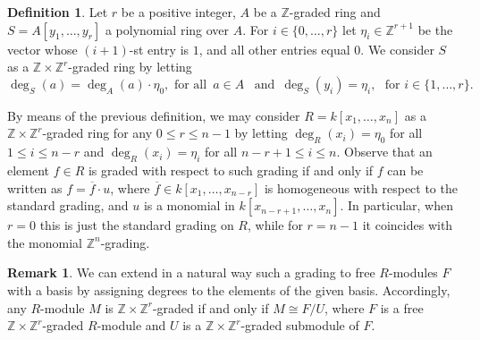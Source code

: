 \documentclass[12pt]{amsart}
\theoremstyle{definition}
\theoremstyle{definition}
\newtheorem{remark}[theorem]{Remark}
\newtheorem{definition}[theorem]{Definition}
\def\NZQ{\mathbb}               %
\def\ZZ{{\NZQ Z}}
\renewcommand{\leq}{\leqslant}
\begin{document}
\begin{definition}
 Let $r$ be a positive integer, $A$ be a $\ZZ$-graded ring and  $S=A[y_1,\ldots,y_r]$ a polynomial ring over $A$. For $i \in \{0,\ldots,r\}$  let $\eta_i \in \ZZ^{r+1}$ be the vector whose $(i+1)$-st entry is $1$, and all other entries equal $0$. We consider $S$ as a $\ZZ \times \ZZ^r$-graded ring by letting
    \[
    \deg_S(a) = \deg_A(a) \cdot \eta_0,\,\,\text{for all }\,  a \in A\,\,\, \text{ and }\,  \deg_S(y_i) = \eta_i, \,\,\text{ for } i \in \{1,\ldots,r\}.
  \]

\end{definition}
By means of the previous definition,  we may consider $R=k[x_1,\ldots,x_n]$ as a $\ZZ \times \ZZ^r$-graded ring for any $0 \leq r \leq n-1$ by letting $\deg_R(x_i) = \eta_0$ for all $1 \leq i \leq n-r$ and $\deg_R(x_i) = \eta_i$ for all $n-r+1 \leq i \leq n$. Observe that an element $f \in R$ is graded with respect to such grading if and only if $f$ can be written as $f=\overline{f} \cdot u$, where $\overline{f} \in k[x_1,\ldots,x_{n-r}]$ is homogeneous with respect to the standard grading, and $u$ is a monomial in $k[x_{n-r+1},\ldots,x_n]$. In particular, when $r=0$ this is just the standard grading on $R$, while for $r=n-1$ it coincides with the monomial $\ZZ^n$-grading. 

\begin{remark} We can extend in a natural way such a grading  to free $R$-modules $F$ with a basis by assigning degrees to the elements of the given basis.  Accordingly, any $R$-module $M$ is $\ZZ \times \ZZ^r$-graded if and only if $M \cong F/U$, where $F$ is a free $\ZZ \times \ZZ^r$-graded $R$-module and $U$ is a $\ZZ \times \ZZ^r$-graded submodule of $F$.
\end{remark}
\end{document}
